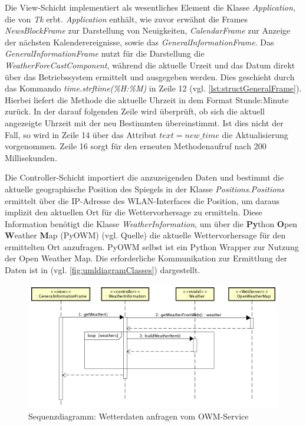 Die View-Schicht implementiert als wesentliches Element die Klasse \textit{Application}, die von \textit{Tk} erbt. 
\textit{Application} enthält, wie zuvor erwähnt die Frames \textit{NewsBlockFrame} zur Darstellung von Neuigkeiten, \textit{CalendarFrame} zur Anzeige der nächsten Kalenderereignisse, sowie das \textit{GeneralInformationFrame}. Das \textit{GeneralInformationFrame} nutzt für die Darstellung die \textit{WeatherForeCastComponent}, während die aktuelle Urzeit und das Datum direkt über das Betriebssystem ermittelt und ausgegeben werden. Dies geschieht durch das Kommando \textit{time.strftime(\grq \%H:\%M\grq)} in Zeile 12 (vgl. \autoref{lst:structGeneralFrame}). Hierbei liefert die Methode die aktuelle Uhrzeit in dem Format Stunde:Minute zurück. In der darauf folgenden Zeile wird überprüft, ob sich die aktuell angezeigte Uhrzeit mit der neu Bestimmten übereinstimmt. Ist dies nicht der Fall, so wird in Zeile 14 über das Attribut \textit{$text=new\_ time$} die Aktualisierung vorgenommen.
Zeile 16 sorgt für den erneuten Methodenaufruf nach 200 Millisekunden.

\begin{minipage}{\textwidth}
	
\end{minipage}
 
Die Controller-Schicht importiert die anzuzeigenden Daten und bestimmt die aktuelle geographische Position des Spiegels in der Klasse  \textit{Positions}.\textit{Positions} ermittelt über die IP-Adresse des WLAN-Interfaces die Position, um daraus implizit den aktuellen Ort für die Wettervorhersage zu ermitteln. Diese Information benötigt die Klasse \textit{WeatherInformation}, um über die \textbf{Py}thon \textbf{O}pen \textbf{W}eather \textbf{M}ap (PyOWM) (vgl. Quelle) die aktuelle Wettervorhersage für den ermittelten Ort anzufragen. PyOWM selbst ist ein Python Wrapper zur Nutzung der Open Weather Map. Die erforderliche Kommunikation zur Ermittlung der Daten ist in (vgl. \autoref{fig:umldiagramClasses}) dargestellt.  
 \begin{figure}
 	\centering
 	\includegraphics[width=0.7\linewidth]{bilder/sequenceDiagramGettingData_v2}
 	\caption{Sequenzdiagramm: Wetterdaten anfragen vom OWM-Service}
 	\label{fig:sequenzDiagramData}
 \end{figure}

